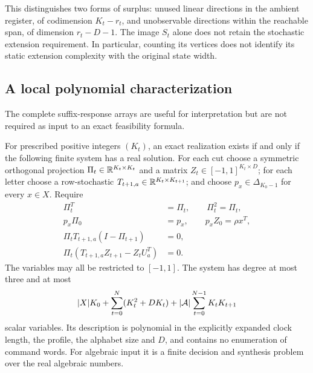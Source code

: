 This distinguishes two forms of surplus: unused linear directions in
the ambient register, of codimension $K_t-r_t$, and unobservable
directions within the reachable span, of dimension $r_t-D-1$.
The image $S_t$ alone does not retain the stochastic extension
requirement. In particular, counting its vertices does not identify
its static extension complexity with the original state width.

\subsection{A local polynomial characterization}
The complete suffix-response arrays are useful for interpretation but
are not required as input to an exact feasibility formula.

\begin{theorem}\label{thm:local51}
For prescribed positive integers $(K_t)$, an exact realization exists
if and only if the following finite system has a real solution.
For each cut choose a symmetric orthogonal projection
$\Pi_t\in\mathbb R^{K_t\times K_t}$ and a matrix
$Z_t\in[-1,1]^{K_t\times D}$; for each letter choose a row-stochastic
$T_{t+1,a}\in\mathbb R^{K_t\times K_{t+1}}$; and choose
$p_x\in\Delta_{K_0-1}$ for every $x\in X$. Require
\begin{align}
 \Pi_t^T&=\Pi_t,\qquad \Pi_t^2=\Pi_t,\label{eq:projector51}\\
 p_x\Pi_0&=p_x,\qquad p_xZ_0=\rho x^T,\label{eq:seed51}\\
 \Pi_tT_{t+1,a}(I-\Pi_{t+1})&=0,\label{eq:invariant51}\\
 \Pi_t(T_{t+1,a}Z_{t+1}-Z_tU_a^T)&=0.\label{eq:intertwine51}
\end{align}
The variables may all be restricted to $[-1,1]$. The system has degree
at most three and at most
\begin{equation}\label{eq:variables51}
 |X|K_0+\sum_{t=0}^N(K_t^2+DK_t)
       +|\mathcal A|\sum_{t=0}^{N-1}K_tK_{t+1}
\end{equation}
scalar variables. Its description is polynomial in the explicitly
expanded clock length, the profile, the alphabet size and $D$, and
contains no enumeration of command words. For algebraic input it is
a finite decision and synthesis problem over the real algebraic
numbers.
\end{theorem}
